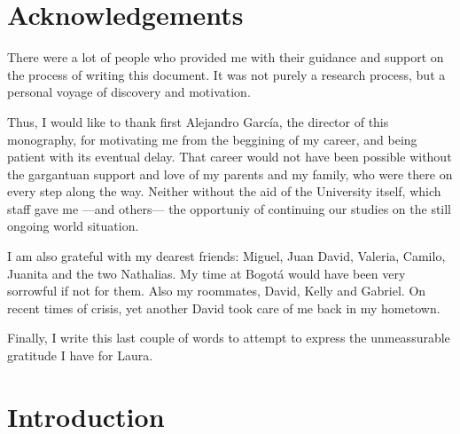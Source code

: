 \documentclass[12pt,letterpaper,oneside]{book}
\begin{document}
\vspace{2mm}

\chapter*{Acknowledgements}

There were a lot of people who provided me with their guidance and support on the process of writing this document. 
It was not purely a research process, but a personal voyage of discovery and motivation. 

Thus, I would like to thank first Alejandro García, the director of this monography, 
for motivating me from the beggining of my career, and being patient with its eventual delay. 
That career would not have been possible without the gargantuan support and love of my parents and my family, 
who were there on every step along the way.
Neither without the aid of the University itself, which staff gave me ---and others--- 
the opportuniy of continuing our studies on the still ongoing world situation.

I am also grateful with my dearest friends: Miguel, Juan David, Valeria, Camilo, Juanita and the two Nathalias. 
My time at Bogotá would have been very sorrowful if not for them. 
Also my roommates, David, Kelly and Gabriel. 
On recent times of crisis, yet another David took care of me back in my hometown.

Finally, I write this last couple of words to attempt to express the unmeassurable gratitude I have for Laura.

\mainmatter

\chapter{Introduction}
\end{document}
